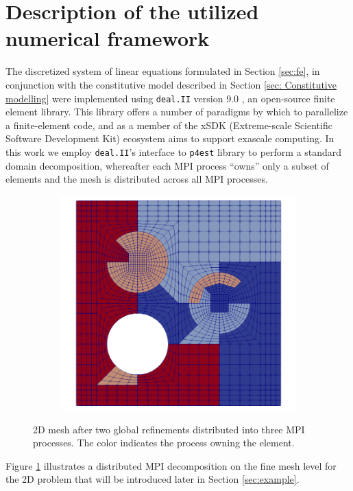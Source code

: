\documentclass[times,doublespace]{nmeauth}
\begin{document}
\section{Description of the utilized numerical framework
\label{sec: Description of numerical framework}
}

The discretized system of linear equations formulated in Section \ref{sec:fe}, in conjunction with the constitutive model described in Section \ref{sec: Constitutive modelling} were implemented using \texttt{deal.II} version 9.0 \cite{dealII90}, an open-source finite element library.
This library offers a number of paradigms by which to parallelize a finite-element code, and as a member of the xSDK (Extreme-scale Scientific Software Development Kit) ecosystem \citep{Bartlett2017b} aims to support exascale computing.
In this work we employ \texttt{deal.II}'s interface to \texttt{p4est} \cite{p4est} library to perform a standard domain decomposition, whereafter each MPI process ``owns'' only a subset of elements and the mesh is distributed across all MPI processes.
%
\begin{figure}[!ht]
  \centering
  \begin{subfigure}[b]{0.8\textwidth}
    \centering
    \includegraphics[width=\textwidth]{fine_level_2d.png}
  \end{subfigure}
  \caption{2D mesh after two global refinements distributed into three MPI processes. The color indicates the process owning the element.}%
  \label{fig:miehe_fine_level}
\end{figure}
%
%
Figure \ref{fig:miehe_fine_level} illustrates a distributed MPI decomposition on the fine mesh level for the 2D problem that will be introduced later in Section \ref{sec:example}.
\end{document}
